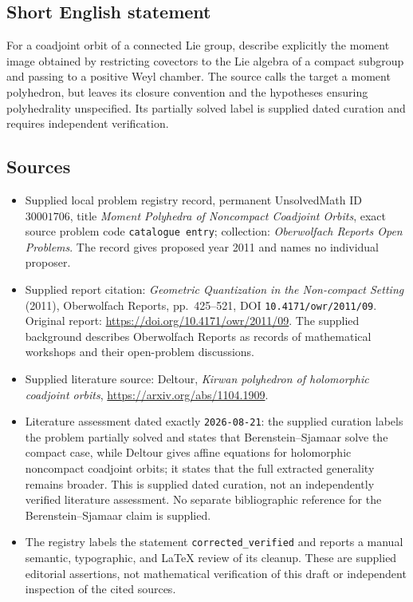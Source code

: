 \documentclass[11pt]{article}
\begin{document}
\subsection{Short English statement}
For a coadjoint orbit of a connected Lie group, describe explicitly the moment image obtained by restricting covectors to the Lie algebra of a compact subgroup and passing to a positive Weyl chamber. The source calls the target a moment polyhedron, but leaves its closure convention and the hypotheses ensuring polyhedrality unspecified. Its partially solved label is supplied dated curation and requires independent verification.
\subsection{Sources}
\begin{itemize}
\item Supplied local problem registry record, permanent UnsolvedMath ID \(30001706\), title \emph{Moment Polyhedra of Noncompact Coadjoint Orbits}, exact source problem code \texttt{catalogue entry}; collection: \emph{Oberwolfach Reports Open Problems}. The record gives proposed year 2011 and names no individual proposer.
\item Supplied report citation: \emph{Geometric Quantization in the Non-compact Setting} (2011), Oberwolfach Reports, pp.~425--521, DOI \texttt{10.4171/owr/2011/09}. Original report: \url{https://doi.org/10.4171/owr/2011/09}. The supplied background describes Oberwolfach Reports as records of mathematical workshops and their open-problem discussions.
\item Supplied literature source: Deltour, \emph{Kirwan polyhedron of holomorphic coadjoint orbits}, \url{https://arxiv.org/abs/1104.1909}.
\item Literature assessment dated exactly \texttt{2026-08-21}: the supplied curation labels the problem partially solved and states that Berenstein--Sjamaar solve the compact case, while Deltour gives affine equations for holomorphic noncompact coadjoint orbits; it states that the full extracted generality remains broader. This is supplied dated curation, not an independently verified literature assessment. No separate bibliographic reference for the Berenstein--Sjamaar claim is supplied.
\item The registry labels the statement \texttt{corrected\_verified} and reports a manual semantic, typographic, and LaTeX review of its cleanup. These are supplied editorial assertions, not mathematical verification of this draft or independent inspection of the cited sources.
\end{itemize}
\end{document}
